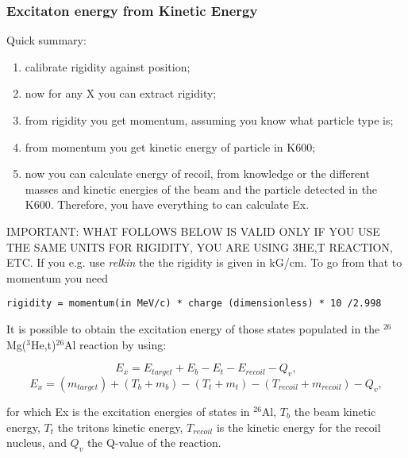 \documentclass[11pt]{report}
\begin{document}
\subsubsection{Excitaton energy from Kinetic Energy}

Quick summary:
\begin{enumerate}
\item calibrate rigidity against position;
\item now for any X you can extract rigidity;
\item from rigidity you get momentum, assuming you know what particle type is;
\item from momentum you get kinetic energy of particle in K600;
\item now you can calculate energy of recoil, from knowledge or the different masses and
kinetic energies of the beam and the particle detected in the K600.
Therefore, you have everything to can calculate Ex.
\end{enumerate}
{\color{red} IMPORTANT: WHAT FOLLOWS BELOW IS VALID ONLY IF YOU USE THE SAME UNITS
FOR RIGIDITY, YOU ARE USING 3HE,T REACTION, ETC.} 
If you e.g. use {\it relkin}
the the rigidity is given in kG/cm. To go from that to momentum you need
\begin{verbatim}
rigidity = momentum(in MeV/c) * charge (dimensionless) * 10 /2.998
\end{verbatim}



It is possible to obtain the excitation energy of those states populated in the $^{26}$Mg($^{3}$He,t)$^{26}$Al reaction by using:  

\begin{equation}
E_x=E_{target}+E_{b}-E_{t}- E_{recoil}-Q_{v},
\end{equation}
\begin{equation}
E_x=(m_{target}) + (T_{b}+m_{b}) - (T_{t}+m_{t}) - (T_{recoil}+m_{recoil}) - Q_{v},
\end{equation}

\noindent
for which Ex is the excitation energies of states in $^{26}$Al, $T_{b}$ the beam kinetic energy, $T_{t}$ the tritons kinetic energy, 
$T_{recoil}$ is the kinetic energy for the recoil nucleus,  and $Q_{v}$ the Q-value of the reaction.\\
\end{document}

